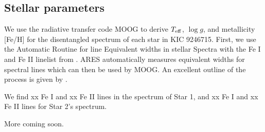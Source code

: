 \subsection{Stellar parameters}\label{parameters}
We use the radiative transfer code MOOG \citep{sne73} to derive $T_{\rm{eff}}$, $\log g$, and metallicity [Fe/H] for the disentangled spectrum of each star in KIC 9246715. First, we use the Automatic Routine for line Equivalent widths in stellar Spectra \citep[ARES,][]{Sousa_2007} with the Fe I and Fe II linelist from \citet{Yong_2005}. ARES automatically measures equivalent widths for spectral lines which can then be used by MOOG. An excellent outline of the process is given by \citet{Sousa_2014}.

We find xx Fe I and xx Fe II lines in the spectrum of Star 1, and xx Fe I and xx Fe II lines for Star 2's spectrum. 

More coming soon.